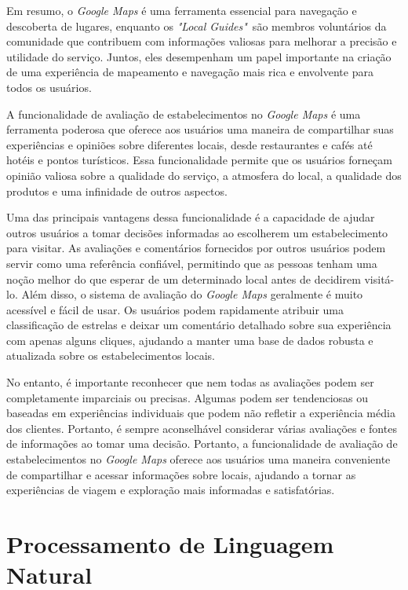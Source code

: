 Em resumo, o \textit{Google Maps} é uma ferramenta essencial para navegação e descoberta de lugares, enquanto os \textit{"Local Guides"}~são membros voluntários da comunidade que contribuem com informações valiosas para melhorar a precisão e utilidade do serviço. Juntos, eles desempenham um papel importante na criação de uma experiência de mapeamento e navegação mais rica e envolvente para todos os usuários.

A funcionalidade de avaliação de estabelecimentos no \textit{Google Maps} é uma ferramenta poderosa que oferece aos usuários uma maneira de compartilhar suas experiências e opiniões sobre diferentes locais, desde restaurantes e cafés até hotéis e pontos turísticos. Essa funcionalidade permite que os usuários forneçam opinião valiosa sobre a qualidade do serviço, a atmosfera do local, a qualidade dos produtos e uma infinidade de outros aspectos.

Uma das principais vantagens dessa funcionalidade é a capacidade de ajudar outros usuários a tomar decisões informadas ao escolherem um estabelecimento para visitar. As avaliações e comentários fornecidos por outros usuários podem servir como uma referência confiável, permitindo que as pessoas tenham uma noção melhor do que esperar de um determinado local antes de decidirem visitá-lo. Além disso, o sistema de avaliação do \textit{Google Maps} geralmente é muito acessível e fácil de usar. Os usuários podem rapidamente atribuir uma classificação de estrelas e deixar um comentário detalhado sobre sua experiência com apenas alguns cliques, ajudando a manter uma base de dados robusta e atualizada sobre os estabelecimentos locais.

No entanto, é importante reconhecer que nem todas as avaliações podem ser completamente imparciais ou precisas. Algumas podem ser tendenciosas ou baseadas em experiências individuais que podem não refletir a experiência média dos clientes. Portanto, é sempre aconselhável considerar várias avaliações e fontes de informações ao tomar uma decisão. Portanto, a funcionalidade de avaliação de estabelecimentos no \textit{Google Maps} oferece aos usuários uma maneira conveniente de compartilhar e acessar informações sobre locais, ajudando a tornar as experiências de viagem e exploração mais informadas e satisfatórias.

\section{Processamento de Linguagem Natural}

